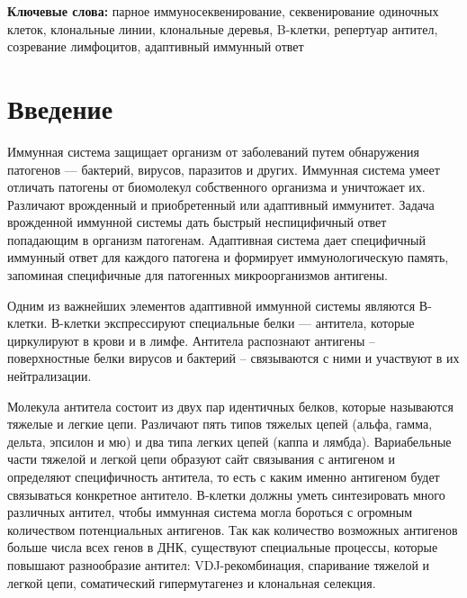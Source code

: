 \documentclass{spbau-diploma}
\begin{document}
\textbf{Ключевые слова:} парное иммуносеквенирование, секвенирование одиночных клеток, клональные линии, клональные деревья, B-клетки, репертуар антител, созревание лимфоцитов, адаптивный иммунный ответ


\section{Введение}

Иммунная система защищает организм от заболеваний путем обнаружения патогенов — бактерий, вирусов, паразитов и других. 
Иммунная система умеет отличать патогены от биомолекул собственного организма и уничтожает их. 
Различают врожденный и приобретенный или адаптивный иммунитет. 
Задача врожденной иммунной системы дать быстрый неспицифичный ответ попадающим в организм патогенам. 
Адаптивная система дает специфичный иммунный ответ для каждого патогена и формирует иммунологическую память, запоминая специфичные для патогенных микроорганизмов антигены.


Одним из важнейших элементов адаптивной иммунной системы являются В-клетки.
В-клетки экспрессируют специальные белки ---  антитела, которые циркулируют в крови и в лимфе.
Антитела распознают антигены -- поверхностные белки вирусов и бактерий -- связываются с ними и участвуют в их нейтрализации.


Молекула антитела состоит из двух пар идентичных белков, которые называются тяжелые и легкие цепи.
Различают пять типов тяжелых цепей (альфа, гамма, дельта, эпсилон и мю) и два типа легких цепей (каппа и лямбда).
Вариабельные части тяжелой и легкой цепи образуют сайт связывания с антигеном и определяют специфичность антитела, то есть с каким именно антигеном будет связываться конкретное антитело.
В-клетки должны уметь синтезировать много различных антител, чтобы иммунная система могла бороться с огромным количеством потенциальных антигенов.
Так как количество возможных антигенов больше числа всех генов в ДНК, существуют специальные процессы, которые повышают разнообразие антител: VDJ-рекомбинация, спаривание тяжелой и легкой цепи, соматический гипермутагенез и клональная селекция.
\end{document}
